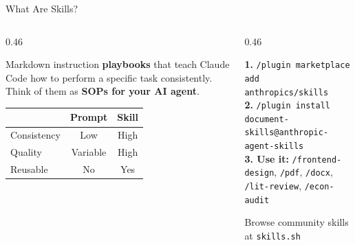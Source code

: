\documentclass[aspectratio=169, 10pt]{beamer}
\begin{document}
\begin{frame}{What Are Skills?}
\begin{columns}[T]
\begin{column}{0.46\textwidth}
\begin{tcolorbox}[keybox, title={\faCubes\quad Definition}]
\small
Markdown instruction \textbf{playbooks} that teach Claude Code how to perform a specific task consistently.
\vskip3pt
Think of them as \textbf{SOPs for your AI agent}.
\vskip3pt
\begin{tabular}{@{}l@{\;}c@{\;}c@{}}
 & \textbf{Prompt} & \textbf{Skill} \\
\midrule
Consistency & \textcolor{SoftCoral}{Low} & \textcolor{SlateTeal}{High} \\
Quality & \textcolor{CoolGray}{Variable} & \textcolor{SlateTeal}{High} \\
Reusable & \textcolor{SoftCoral}{No} & \textcolor{SlateTeal}{Yes} \\
\end{tabular}
\end{tcolorbox}
\end{column}
\begin{column}{0.46\textwidth}
\begin{tcolorbox}[keybox, title={\faDownload\quad Installing Skills}]
\small
\textbf{1.} \texttt{/plugin marketplace add}\\
\quad\texttt{anthropics/skills}\\[2pt]
\textbf{2.} \texttt{/plugin install}\\
\quad\texttt{document-skills@anthropic-agent-skills}\\[2pt]
\textbf{3. Use it:} \texttt{/frontend-design}, \texttt{/pdf}, \texttt{/docx}, \texttt{/lit-review}, \texttt{/econ-audit}
\end{tcolorbox}
\vskip3pt
{\tiny\color{CoolGray} Browse community skills at \texttt{skills.sh}}
\end{column}
\end{columns}
\end{frame}
\end{document}
